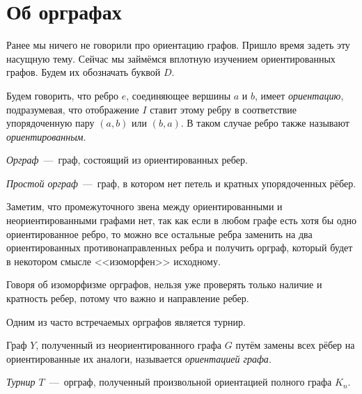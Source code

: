 \newpage
\section{Об орграфах}

	Ранее мы ничего не говорили про ориентацию графов. Пришло время задеть эту насущную тему. Сейчас мы займёмся вплотную изучением ориентированных графов. Будем их обозначать буквой $D$.
	
	
\begin{definition}
	Будем говорить, что ребро $e$, соединяющее вершины $a$ и $b$, имеет \emph{ориентацию}, подразумевая, что отображение $I$ ставит этому ребру в соответствие упорядоченную пару $(a, b)$ или $(b, a)$. В таком случае ребро также называют \emph{ориентированным}.
\end{definition}

\begin{definition}
	\emph{Орграф}~---~граф, состоящий из ориентированных ребер.
\end{definition}

\begin{definition}
	\emph{Простой орграф}~---~граф, в котором нет петель и кратных упорядоченных рёбер.
\end{definition}

	Заметим, что промежуточного звена между ориентированными и неориентированными графами нет, так как если в любом графе есть хотя бы одно ориентированное ребро, то можно все остальные ребра заменить на два ориентированных противонаправленных ребра и получить орграф, который будет в некотором смысле <<изоморфен>> исходному.
	
	Говоря об изоморфизме орграфов, нельзя уже проверять только наличие и кратность ребер, потому что важно и направление ребер.

	Одним из часто встречаемых орграфов является турнир.

\begin{definition}
	Граф $Y$, полученный из неориентированного графа $G$ путём замены всех рёбер на ориентированные их аналоги, называется \emph{ориентацией графа}.
\end{definition}	
\begin{definition}
	\emph{Турнир $T$}~---~орграф, полученный произвольной ориентацией полного графа $K_n$.
\end{definition}

